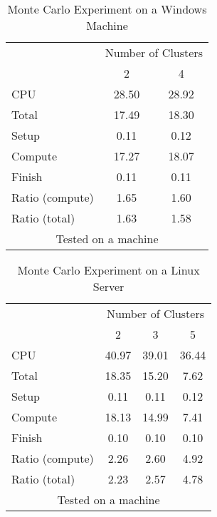 \documentclass[letterpaper, 10pt]{article}
\begin{document}
\begin{table}[!h]
\centering
\caption{Monte Carlo Experiment on a Windows Machine}
\begin{tabular}{l*{2}{c}}\hline
& \multicolumn{2}{c}{Number of Clusters} \\
& 2 &               4 \\ \hline
CPU &    28.50 &     28.92 \\
Total &    17.49 &     18.30 \\
\hspace{2mm} Setup &     0.11 &      0.12 \\
\hspace{2mm} Compute &    17.27 &     18.07 \\
\hspace{2mm} Finish &     0.11 &      0.11 \\
\hline Ratio (compute) &     1.65 &      1.60 \\
Ratio (total) &     1.63 &      1.58 \\
\hline
\multicolumn{3}{c}{\footnotesize Tested on a \win1 machine}
\end{tabular}
\end{table}

\begin{table}[!h]
\centering
\caption{Monte Carlo Experiment on a Linux Server}
\begin{tabular}{l*{3}{c}}\hline
& \multicolumn{3}{c}{Number of Clusters} \\
& 2 &               3 &               5 \\ \hline
CPU &    40.97 &     39.01 &     36.44 \\
Total &    18.35 &     15.20 &      7.62 \\
\hspace{2mm} Setup &     0.11 &      0.11 &      0.12 \\
\hspace{2mm} Compute &    18.13 &     14.99 &      7.41 \\
\hspace{2mm} Finish &     0.10 &      0.10 &      0.10 \\
\hline Ratio (compute) &     2.26 &      2.60 &      4.92 \\
Ratio (total) &     2.23 &      2.57 &      4.78 \\
\hline
\multicolumn{4}{c}{\footnotesize Tested on a \unix1 machine}
\end{tabular}
\end{table}
\end{document}
